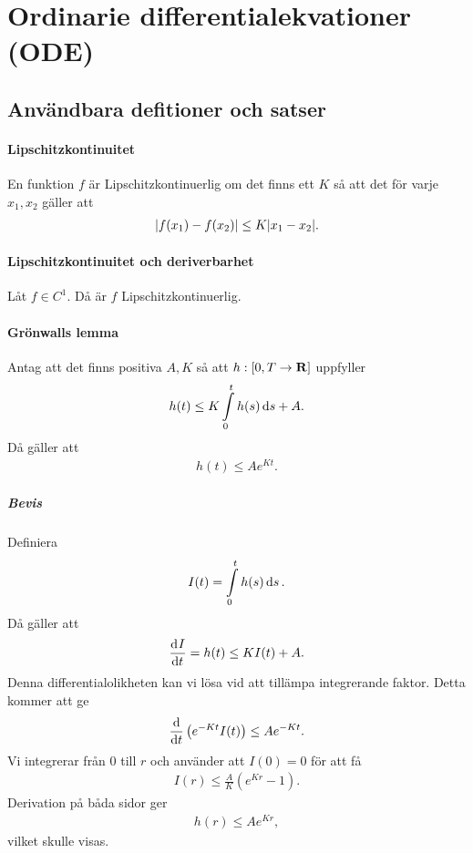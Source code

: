 \section{Ordinarie differentialekvationer (ODE)}

\subsection{Användbara defitioner och satser}

\paragraph{Lipschitzkontinuitet}
En funktion $f$ är Lipschitzkontinuerlig om det finns ett $K$ så att det för varje $x_1, x_2$ gäller att
\begin{align*}
	\abs{f(x_1) - f(x_2)} \leq K\abs{x_1 - x_2}.
\end{align*}

\paragraph{Lipschitzkontinuitet och deriverbarhet}
Låt $f\in C^{1}$. Då är $f$ Lipschitzkontinuerlig.

\paragraph{Grönwalls lemma}
Antag att det finns positiva $A, K$ så att $h: [0, T\to\mathbf{R}]$ uppfyller
\begin{align*}
	h(t) \leq K\int\limits_{0}^{t}h(s)\dd{s} + A.
\end{align*}
Då gäller att
\begin{align*}
	h(t) \leq Ae^{Kt}.
\end{align*}

\subparagraph{Bevis}
Definiera
\begin{align*}
	I(t) = \int\limits_{0}^{t}h(s)\dd{s}.
\end{align*}
Då gäller att
\begin{align*}
	\dv[]{I}{t} (t) = h(t) \leq KI(t) + A.
\end{align*}
Denna differentialolikheten kan vi lösa vid att tillämpa integrerande faktor. Detta kommer att ge
\begin{align*}
	\dv{t}\left(e^{-Kt}I(t)\right) \leq Ae^{-Kt}.
\end{align*}
Vi integrerar från $0$ till $r$ och använder att $I(0) = 0$ för att få
\begin{align*}
	I(r) \leq \frac{A}{K}(e^{Kr} - 1).
\end{align*}
Derivation på båda sidor ger
\begin{align*}
	h(r) \leq Ae^{Kr},
\end{align*}
vilket skulle visas.

